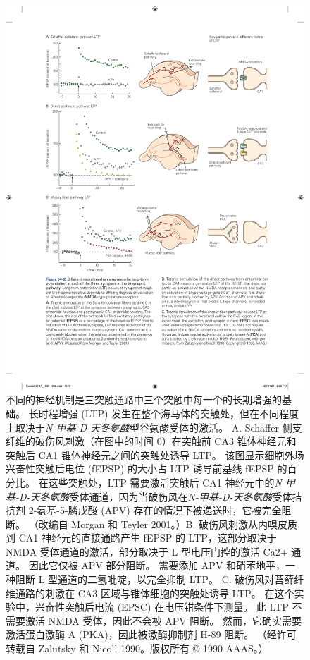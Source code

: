 \begin{figure}[htbp]
	\centering
	\includegraphics[width=0.9\linewidth]{chap54/fig_54_2}
	\caption{不同的神经机制是三突触通路中三个突触中每一个的长期增强的基础。 长时程增强 (LTP) 发生在整个海马体的突触处，但在不同程度上取决于\textit{N-甲基-D-天冬氨酸}型谷氨酸受体的激活。 A. Schaffer 侧支纤维的破伤风刺激（在图中的时间 0）在突触前 CA3 锥体神经元和突触后 CA1 锥体神经元之间的突触处诱导 LTP。 该图显示细胞外场兴奋性突触后电位 (fEPSP) 的大小占 LTP 诱导前基线 fEPSP 的百分比。 在这些突触处，LTP 需要激活突触后 CA1 神经元中的\textit{N-甲基-D-天冬氨酸}受体通道，因为当破伤风在\textit{N-甲基-D-天冬氨酸}受体拮抗剂 2-氨基-5-膦戊酸 (APV) 存在的情况下被递送时，它被完全阻断。 （改编自 Morgan 和 Teyler 2001。）B. 破伤风刺激从内嗅皮质到 CA1 神经元的直接通路产生 fEPSP 的 LTP，这部分取决于 NMDA 受体通道的激活，部分取决于 L 型电压门控的激活 Ca2+ 通道。 因此它仅被 APV 部分阻断。 需要添加 APV 和硝苯地平，一种阻断 L 型通道的二氢吡啶，以完全抑制 LTP。 C. 破伤风对苔藓纤维通路的刺激在 CA3 区域与锥体细胞的突触处诱导 LTP。 在这个实验中，兴奋性突触后电流 (EPSC) 在电压钳条件下测量。 此 LTP 不需要激活 NMDA 受体，因此不会被 APV 阻断。 然而，它确实需要激活蛋白激酶 A (PKA)，因此被激酶抑制剂 H-89 阻断。 （经许可转载自 Zalutsky 和 Nicoll 1990。版权所有 © 1990 AAAS。）}
	\label{fig:54_2}
\end{figure}



